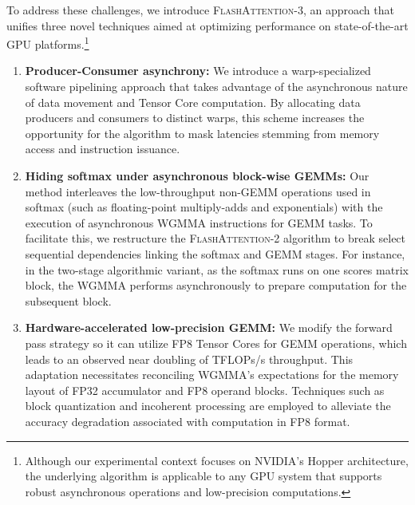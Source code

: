 To address these challenges, we introduce \textsc{FlashAttention-3}, an approach that unifies three novel techniques aimed at optimizing performance on state-of-the-art GPU platforms.\footnote{Although our experimental context focuses on NVIDIA's Hopper architecture, the underlying algorithm is applicable to any GPU system that supports robust asynchronous operations and low-precision computations.}

\begin{enumerate}

\item \textbf{Producer-Consumer asynchrony:} We introduce a warp-specialized software pipelining approach that takes advantage of the asynchronous nature of data movement and Tensor Core computation. By allocating data producers and consumers to distinct warps, this scheme increases the opportunity for the algorithm to mask latencies stemming from memory access and instruction issuance.
\item \textbf{Hiding softmax under asynchronous block-wise GEMMs:} Our method interleaves the low-throughput non-GEMM operations used in softmax (such as floating-point multiply-adds and exponentials) with the execution of asynchronous WGMMA instructions for GEMM tasks. To facilitate this, we restructure the \textsc{FlashAttention-2} algorithm to break select sequential dependencies linking the softmax and GEMM stages. For instance, in the two-stage algorithmic variant, as the softmax runs on one scores matrix block, the WGMMA performs asynchronously to prepare computation for the subsequent block.
\item \textbf{Hardware-accelerated low-precision GEMM:} We modify the forward pass strategy so it can utilize FP8 Tensor Cores for GEMM operations, which leads to an observed near doubling of TFLOPs/s throughput. This adaptation necessitates reconciling WGMMA’s expectations for the memory layout of FP32 accumulator and FP8 operand blocks. Techniques such as block quantization and incoherent processing are employed to alleviate the accuracy degradation associated with computation in FP8 format.
\end{enumerate}

